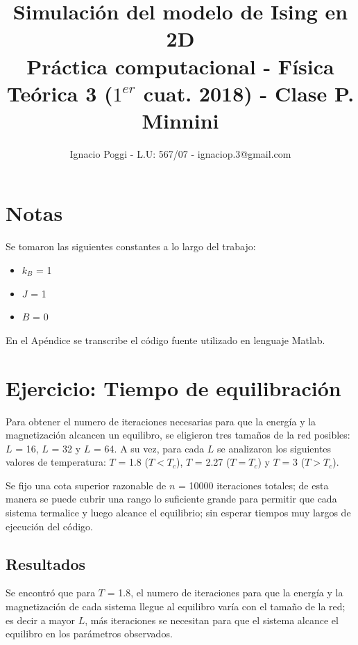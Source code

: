 \documentclass[a4paper,12pt]{article}
\begin{document}
 

\title{Simulaci\'on del modelo de Ising en 2D \\
\large Pr\'actica computacional - F\'isica Te\'orica 3 ($1^{er}$ cuat. 2018) - Clase P. Minnini}
\author{Ignacio Poggi - L.U: 567/07 - ignaciop.3@gmail.com}
\maketitle

\section{Notas}

Se tomaron las siguientes constantes a lo largo del trabajo:

\begin{itemize}
\item $k_{B}$ = 1
\item $J$ = 1
\item $B$ = 0
\end{itemize}

En el Ap\'endice se transcribe el c\'odigo fuente utilizado en lenguaje Matlab.

\section{Ejercicio: Tiempo de equilibraci\'on}

Para obtener el numero de iteraciones necesarias para que la energ\'ia y la magnetizaci\'on alcancen un equilibro, se eligieron tres tama\~nos de la red posibles: $L$ = 16, $L$ = 32 y $L$ = 64.
A su vez, para cada $L$ se analizaron los siguientes valores de temperatura: $T$ = 1.8 ($T < T_{c}$), $T$ = 2.27 ($T = T_{c}$) y $T$ = 3 ($T > T_{c}$).

Se fijo una cota superior razonable de $n$ = 10000 iteraciones totales; de esta manera se puede cubrir una rango lo suficiente grande para permitir que cada sistema termalice y luego alcance el equilibrio; sin esperar tiempos muy largos de ejecuci\'on del c\'odigo.

\subsection{Resultados}

Se encontr\'o que para $T$ = 1.8, el numero de iteraciones para que la energ\'ia y la magnetizaci\'on de cada sistema llegue al equilibro var\'ia con el tama\~no de la red; es decir a mayor $L$, m\'as iteraciones se necesitan para que el sistema alcance el equilibro en los par\'ametros observados.
\end{document}
